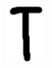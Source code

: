 \documentclass[russian,utf8,emptystyle]{eskdtext}
\begin{document}
\begin{figure}[!htb]
\includegraphics[width=\linewidth]{../data/learn/t/001}
\endminipage\hfill
{}

\end{figure}
\end{document}
